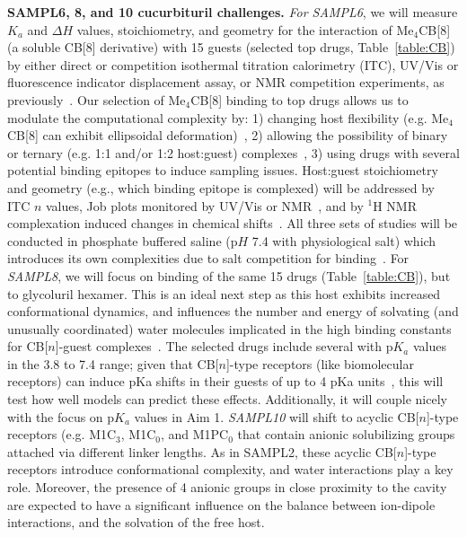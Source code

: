 \documentclass[11pt]{article}
\begin{document}
\textbf{SAMPL6, 8, and 10 cucurbituril challenges.} 
\emph{For SAMPL6}, we will measure $K_a$ and $\Delta H$ values, stoichiometry, and geometry for the interaction of Me$_4$CB[8] (a soluble CB[8] derivative) with 15 guests (selected top drugs, Table~\ref{table:CB}) by either direct or competition isothermal titration calorimetry (ITC), UV/Vis or fluorescence indicator displacement assay, or NMR competition experiments, as previously~\cite{cao_attomolar_2014, liu_cucurbituril_2005, ma_acyclic_2010, she_glycoluril-derived_2016}.  
Our selection of Me$_4$CB[8] binding to top drugs allows us to modulate the computational complexity by: 1) changing host flexibility (e.g. Me$_4$CB[8] can exhibit ellipsoidal deformation)~\cite{vinciguerra_synthesis_2015}, 2) allowing the possibility of binary or ternary (e.g. 1:1 and/or 1:2 host:guest) complexes~\cite{ko_supramolecular_2007, barrow_cucurbituril-based_2015, urbach_molecular_2011}, 3) using drugs with several potential binding epitopes to induce sampling issues.  Host:guest stoichiometry and geometry (e.g., which binding epitope is complexed) will be addressed by ITC $n$ values, Job plots monitored by UV/Vis or NMR~\cite{connors_binding_1987}, and by $^1$H NMR complexation induced changes in chemical shifts~\cite{masson_cucurbituril_2012}.  
All three sets of studies will be conducted in phosphate buffered saline (p$H$ 7.4 with physiological salt) which introduces its own complexities due to salt competition for binding~\cite{marquez_mechanism_2004, mobley_predicting_2016}. 
For \emph{SAMPL8}, we will focus on binding of the same 15 drugs (Table~\ref{table:CB}), but to glycoluril hexamer. 
This is an ideal next step as this host exhibits increased conformational dynamics, and influences the number and energy of solvating (and unusually coordinated) water molecules implicated in the high binding constants for CB[$n$]-guest complexes~\cite{biedermann_release_2012, biedermann_hydrophobic_2014}.  
The selected drugs include several with p$K_a$ values in the 3.8 to 7.4 range; given that CB[$n$]-type receptors (like biomolecular receptors) can induce pKa shifts in their guests of up to 4 pKa units~\cite{saleh_activation_2008, nau_deep_2011, ghosh_strategic_2012}, this will test how well models can predict these effects. 
Additionally, it will couple nicely with the focus on p$K_a$ values in Aim 1.
\emph{SAMPL10} will shift to acyclic CB[$n$]-type receptors (e.g. M1C$_3$, M1C$_0$, and M1PC$_0$ that contain anionic solubilizing groups attached via different linker lengths.  
As in SAMPL2, these acyclic CB[$n$]-type receptors introduce conformational complexity, and water interactions play a key role.
Moreover, the presence of 4 anionic groups in close proximity to the cavity are expected to have a significant influence on the balance between ion-dipole interactions, and the solvation of the free host.
\end{document}
